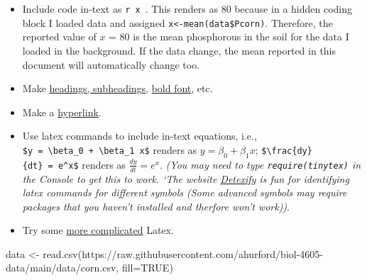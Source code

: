 \documentclass[
]{book}
\newenvironment{Shaded}{\begin{snugshade}}{\end{snugshade}}
\newcommand{\AttributeTok}[1]{\textcolor[rgb]{0.77,0.63,0.00}{#1}}
\newcommand{\ConstantTok}[1]{\textcolor[rgb]{0.00,0.00,0.00}{#1}}
\newcommand{\FunctionTok}[1]{\textcolor[rgb]{0.00,0.00,0.00}{#1}}
\newcommand{\NormalTok}[1]{#1}
\newcommand{\OtherTok}[1]{\textcolor[rgb]{0.56,0.35,0.01}{#1}}
\newcommand{\StringTok}[1]{\textcolor[rgb]{0.31,0.60,0.02}{#1}}
\begin{document}
\begin{itemize}
\item
  Include code in-text as \texttt{\textasciigrave{}r\ x\ \textasciigrave{}}. This renders as 80 because in a hidden coding block I loaded data and assigned \texttt{x\textless{}-mean(data\$Pcorn)}. Therefore, the reported value of \(x\) = 80 is the mean phosphorous in the soil for the data I loaded in the background. If the data change, the mean reported in this document will automatically change too.
\item
  Make \href{https://bookdown.org/yihui/rmarkdown/markdown-syntax.html\#block-level-elements}{headings, subheadings}, \href{https://bookdown.org/yihui/rmarkdown/markdown-syntax.html\#inline-formatting}{bold font}, etc.
\item
  Make a \href{https://bookdown.org/yihui/rmarkdown/markdown-syntax.html\#inline-formatting}{hyperlink}.
\item
  Use latex commands to include in-text equations, i.e., \texttt{\$y\ =\ \textbackslash{}beta\_0\ +\ \textbackslash{}beta\_1\ x\$} renders as \(y = \beta_0 + \beta_1 x\); \texttt{\$\textbackslash{}frac\{dy\}\{dt\}\ =\ e\^{}x\$} renders as \(\frac{dy}{dt} = e^x\). \emph{(You may need to type \texttt{require(tinytex)} in the Console to get this to work. `The website \href{https://detexify.kirelabs.org/classify.html}{Detexify} is fun for identifying latex commands for different symbols (Some advanced symbols may require packages that you haven't installed and therfore won't work))}.
\item
  Try some \href{https://bookdown.org/yihui/rmarkdown/markdown-syntax.html\#math-expressions}{more complicated} Latex.
\end{itemize}

\begin{Shaded}
\begin{Highlighting}[]
\NormalTok{data }\OtherTok{\textless{}{-}} \FunctionTok{read.csv}\NormalTok{(}\StringTok{\textquotesingle{}https://raw.githubusercontent.com/ahurford/biol{-}4605{-}data/main/data/corn.csv\textquotesingle{}}\NormalTok{, }\AttributeTok{fill=}\ConstantTok{TRUE}\NormalTok{)}
\end{Highlighting}
\end{Shaded}
\end{document}
